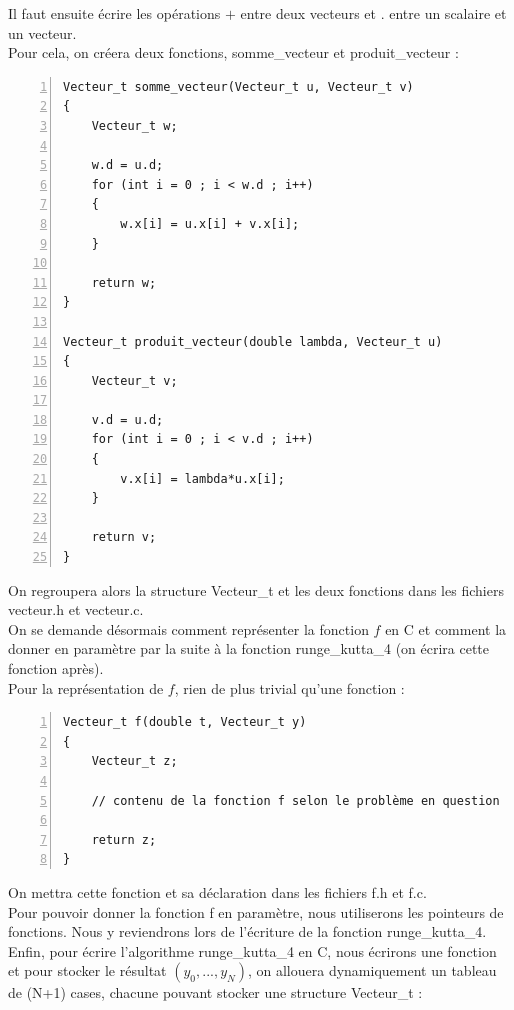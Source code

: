 \documentclass[9pt,a4paper]{article}
\begin{document}
Il faut ensuite écrire les opérations $+$ entre deux vecteurs et $.$ entre un scalaire et un vecteur. \\
Pour cela, on créera deux fonctions, somme\_vecteur et produit\_vecteur : \\
\begin{Verbatim}[numbers=left, frame=single]
Vecteur_t somme_vecteur(Vecteur_t u, Vecteur_t v)
{
    Vecteur_t w;

    w.d = u.d;
    for (int i = 0 ; i < w.d ; i++)
    {
        w.x[i] = u.x[i] + v.x[i];
    }

    return w;
}

Vecteur_t produit_vecteur(double lambda, Vecteur_t u)
{
    Vecteur_t v;

    v.d = u.d;
    for (int i = 0 ; i < v.d ; i++)
    {
        v.x[i] = lambda*u.x[i];
    }

    return v;
}
\end{Verbatim}
On regroupera alors la structure Vecteur\_t et les deux fonctions dans les fichiers vecteur.h et vecteur.c.\\
On se demande désormais comment représenter la fonction $f$ en C et comment la donner en paramètre par la suite à la fonction runge\_kutta\_4 (on écrira cette fonction après).\\
Pour la représentation de $f$, rien de plus trivial qu'une fonction :\\
\begin{Verbatim}[numbers=left, frame=single]
Vecteur_t f(double t, Vecteur_t y)
{
    Vecteur_t z;

    // contenu de la fonction f selon le problème en question

    return z;
}
\end{Verbatim}
On mettra cette fonction et sa déclaration dans les fichiers f.h et f.c.\\
Pour pouvoir donner la fonction f en paramètre, nous utiliserons les pointeurs de fonctions. Nous y reviendrons lors de l'écriture de la fonction runge\_kutta\_4.\\
Enfin, pour écrire l'algorithme runge\_kutta\_4 en C, nous écrirons une fonction et pour stocker le résultat $(y_0, ..., y_N)$, on allouera dynamiquement un tableau de (N+1) cases, chacune pouvant stocker une structure Vecteur\_t :\\
\end{document}
